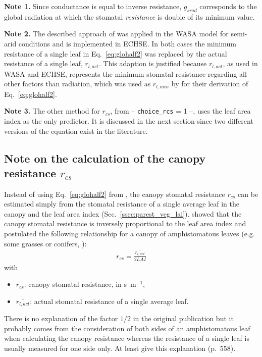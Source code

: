 \documentclass{scrreprt}
\newenvironment{denseitem}{
  \begin{itemize}
    \setlength{\itemsep}{0pt}
    \setlength{\parskip}{0pt}
    \setlength{\parsep}{0pt}
}{
  \end{itemize}
}
\begin{document}
\noindent
\textbf{Note 1.}
Since conductance is equal to inverse resistance, $g_{srad}$ corresponds to the global radiation at which the stomatal \emph{resistance} is double of its minimum value.

\noindent
\textbf{Note 2.}
The described approach of \citet{saugier91} was applied in the WASA model for semi-arid conditions \citep{guentner02} and is implemented in ECHSE.
In both cases the minimum resistance of a single leaf in Eq.~\eqref{eq:glohalf2} was replaced by the actual resistance of a single leaf, $r_{l,act}$.
This adaption is justified because $r_{l,act}$, as used in WASA and ECHSE, represents the minimum stomatal resistance regarding all other factors than radiation, which was used as $r_{l,min}$ by \citet{saugier91} for their derivation of Eq.~\eqref{eq:glohalf2}.

\noindent
\textbf{Note 3.}
The other method for $r_{cs}$, from \citet{shuttleworth85} -- \verb!choice_rcs! = 1 --, uses the leaf area index as the only predictor.
It is discussed in the next section since two different versions of the equation exist in the literature.

\newpage
\subsection{Note on the calculation of the canopy resistance $r_{cs}$} \label{ssec:parest_veg_notercs}

Instead of using Eq.~\eqref{eq:glohalf2} from \citet{saugier91}, the canopy stomatal resistance $r_{cs}$ can be estimated simply from the stomatal resistance of a single average leaf in the canopy and the leaf area index (Sec.~\ref{ssec:parest_veg_lai}).
\citet{shuttleworth76} showed that the canopy stomatal resistance is inversely proportional to the leaf area index and postulated the following relationship for a canopy of amphistomatous leaves (e.g. some grasses or conifers, \citealt{shuttleworth85}):
\begin{align} \label{eq:notercs1}
  r_{cs} = \frac{\overline{r_{l,act}}}{2 LAI}
\end{align}
%
with
\begin{denseitem}
  \item[] $r_{cs}$: canopy stomatal resistance, in s~m$^{-1}$,
  \item[] $\overline{r_{l,act}}$: actual stomatal resistance of a single average leaf.
\end{denseitem}
%
There is no explanation of the factor $1/2$ in the original publication but it probably comes from the consideration of both sides of an amphistomatous leaf when calculating the canopy resistance whereas the resistance of a single leaf is usually measured for one side only.
At least \citet{hanan97} give this explanation (p.\ 558).
\end{document}
